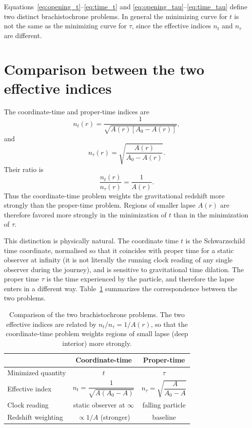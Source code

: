 \documentclass[
  aps,
  prd,
  twocolumn,
  nofootinbib,
  superscriptaddress,
  longbibliography
]{revtex4-2}
\begin{document}
Equations~\eqref{eq:opening_t}--\eqref{eq:time_t} and
\eqref{eq:opening_tau}--\eqref{eq:time_tau} define two distinct
brachistochrone problems. In general the minimizing curve for $t$ is
not the same as the minimizing curve for $\tau$, since the effective
indices $n_t$ and $n_\tau$ are different.

\section{Comparison between the two effective indices}
\label{sec:indices}

The coordinate-time and proper-time indices are
\begin{equation}
n_t(r)
=
\frac{1}
{\sqrt{A(r)\left[A_0-A(r)\right]}},
\end{equation}
and
\begin{equation}
n_\tau(r)
=
\sqrt{
\frac{A(r)}{A_0-A(r)}
}.
\end{equation}
Their ratio is
\begin{equation}
\frac{n_t(r)}{n_\tau(r)}
=
\frac{1}{A(r)}.
\end{equation}
Thus the coordinate-time problem weights the gravitational redshift
more strongly than the proper-time problem. Regions of smaller lapse
$A(r)$ are therefore favored more strongly in the minimization of $t$
than in the minimization of $\tau$.

This distinction is physically natural. The coordinate time $t$ is the
Schwarzschild time coordinate, normalised so that it coincides with
proper time for a static observer at infinity (it is not literally the
running clock reading of any single observer during the journey), and
is sensitive to gravitational time dilation. The proper time $\tau$ is
the time experienced by the particle, and therefore the lapse enters in
a different way. Table~\ref{tab:compare} summarizes the correspondence
between the two problems.

\begin{table}[tb]
\centering
\caption{Comparison of the two brachistochrone problems. The two
effective indices are related by $n_t/n_\tau=1/A(r)$, so that the
coordinate-time problem weights regions of small lapse (deep interior)
more strongly.}
\label{tab:compare}
\begin{tabular}{lcc}
\hline\hline
& Coordinate-time & Proper-time \\
\hline
Minimized quantity & $t$ & $\tau$ \\
Effective index & $n_t=\dfrac{1}{\sqrt{A(A_0-A)}}$
                & $n_\tau=\sqrt{\dfrac{A}{A_0-A}}$ \\[6pt]
Clock reading      & static observer at $\infty$ & falling particle \\
Redshift weighting & $\propto 1/A$ (stronger) & baseline \\
\hline\hline
\end{tabular}
\end{table}
\end{document}

